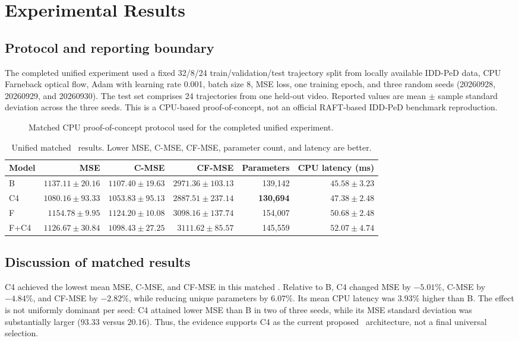 \section{Experimental Results}
\label{sec:results}

\subsection{Protocol and reporting boundary}
The completed unified experiment used a fixed 32/8/24 train/validation/test trajectory split from locally available IDD-PeD data, CPU Farneback optical flow, Adam with learning rate 0.001, batch size 8, MSE loss, one training epoch, and three random seeds (20260928, 20260929, and 20260930). The test set comprises 24 trajectories from one held-out video. Reported values are mean $\pm$ sample standard deviation across the three seeds. This is a CPU-based proof-of-concept, not an official RAFT-based IDD-PeD benchmark reproduction.

\begin{figure}[t]
\centering
\resizebox{\textwidth}{!}{}
\caption{Matched CPU proof-of-concept protocol used for the completed unified experiment.}
\label{fig:protocol}
\end{figure}

\begin{table}[t]
\centering
\footnotesize
\caption{Unified matched \poc\ results. Lower MSE, C-MSE, CF-MSE, parameter count, and latency are better.}
\label{tab:unified}
\begin{tabular}{lrrrrr}
\toprule
Model & MSE & C-MSE & CF-MSE & Parameters & CPU latency (ms)\\
\midrule
B & $1137.11\pm20.16$ & $1107.40\pm19.63$ & $2971.36\pm103.13$ & 139,142 & $45.58\pm3.23$\\
C4 & $\mathbf{1080.16\pm93.33}$ & $\mathbf{1053.83\pm95.13}$ & $\mathbf{2887.51\pm237.14}$ & \textbf{130,694} & $47.38\pm2.48$\\
F & $1154.78\pm9.95$ & $1124.20\pm10.08$ & $3098.16\pm137.74$ & 154,007 & $50.68\pm2.48$\\
F+C4 & $1126.67\pm30.84$ & $1098.43\pm27.25$ & $3111.62\pm85.57$ & 145,559 & $52.07\pm4.74$\\
\bottomrule
\end{tabular}
\end{table}

\subsection{Discussion of matched results}
C4 achieved the lowest mean MSE, C-MSE, and CF-MSE in this matched \poc. Relative to B, C4 changed MSE by $-5.01\%$, C-MSE by $-4.84\%$, and CF-MSE by $-2.82\%$, while reducing unique parameters by $6.07\%$. Its mean CPU latency was $3.93\%$ higher than B. The effect is not uniformly dominant per seed: C4 attained lower MSE than B in two of three seeds, while its MSE standard deviation was substantially larger ($93.33$ versus $20.16$). Thus, the evidence supports C4 as the current proposed \poc\ architecture, not a final universal selection.

